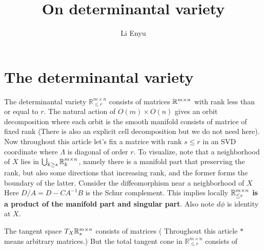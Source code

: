 \documentclass[]{note}
\title{{{On determinantal variety}}}
\author{{{Li Enyu}}}
\date{}
\begin{document}
\maketitle
\def\sym{\mathrm{Sym}}
\def\St{\mathrm{St}}
\def\H{\mathscr H}
\def\deter{\mathbb R_{\le r}^{m\times n}}
\section{The determinantal variety}The determinantal variety $\mathbb R_{\le r}^{m\times n}$ consists of matrices $\mathbb{R}^{m\times n}$ with rank less than or equal to $r$. The natural action of $O(m)\times O(n)$ gives an orbit decomposition \gs{
    \deter=\bigcup_{s\le r}\R_s^{m\times n}
} where each orbit is the smooth manifold consists of matrice of fixed rank (There is also an explicit cell decomposition but we do not need here).
Now  throughout this article let's fix a matrice with rank $s\le r$ in an SVD coordinate where $\Lambda$ is diagonal of order $r$. To visualize, note that a neighborhood of $X$ lies in $\bigcup_{k\ge s}\mathbb{R}_k^{m\times n}$, namely there is a manifold part that preserving the rank, but also some directions that increasing rank, and the former forms the boundary of the latter. 
Consider the diffeomorphism near a neighborhood of $X$Here $D/A=D-CA^{-1}B$ is the Schur complement.
This implies locally $\mathbb{R}_{\le r}^{m\times n}$ \textbf{is a product of the manifold part and singular part}. Also note $d\phi$ is identity at $X$.

The tangent space $T_X\mathbb{R}^{m\times n}_s$ consists of matrices (
Throughout this article $*$ means arbitrary matrices.)
But the total tangent cone in $\deter$ consists of 
\end{document}
